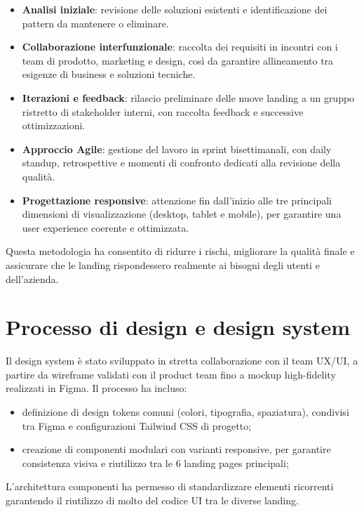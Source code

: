 \begin{itemize}
  \item \textbf{Analisi iniziale}: revisione delle soluzioni esistenti e
  identificazione dei pattern da mantenere o eliminare.
  \item \textbf{Collaborazione interfunzionale}: raccolta dei requisiti in
  incontri con i team di prodotto, marketing e design, così da garantire
  allineamento tra esigenze di business e soluzioni tecniche.
  \item \textbf{Iterazioni e feedback}: rilascio preliminare delle nuove landing
  a un gruppo ristretto di stakeholder interni, con raccolta feedback e successive
  ottimizzazioni.
  \item \textbf{Approccio Agile}: gestione del lavoro in sprint bisettimanali,
  con daily standup, retrospettive e momenti di confronto dedicati alla revisione
  della qualità.
  \item \textbf{Progettazione responsive}: attenzione fin dall'inizio alle tre
  principali dimensioni di visualizzazione (desktop, tablet e mobile), per
  garantire una user experience coerente e ottimizzata.
\end{itemize}

Questa metodologia ha consentito di ridurre i rischi, migliorare la qualità
finale e assicurare che le landing rispondessero realmente ai bisogni degli utenti
e dell'azienda.

\section{Processo di design e design system}
Il design system è stato sviluppato in stretta collaborazione con il team UX/UI,
a partire da wireframe validati con il product team fino a mockup
high-fidelity realizzati in Figma. Il processo ha incluso:

\begin{itemize}
  \item definizione di design tokens comuni (colori, tipografia, spaziatura),
  condivisi tra Figma e configurazioni Tailwind CSS di progetto;
  \item creazione di componenti modulari con varianti responsive, per garantire 
consistenza visiva e riutilizzo tra le 6 landing pages principali;
\end{itemize}

L'architettura componenti ha permesso di standardizzare elementi ricorrenti garantendo il riutilizzo di molto del codice UI tra le diverse landing.

